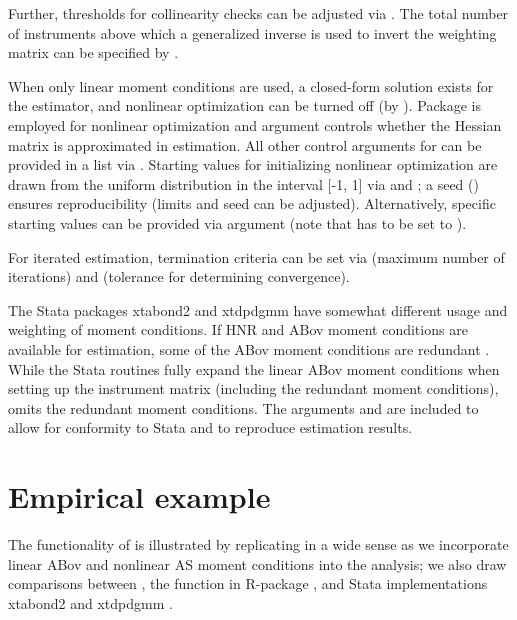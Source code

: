 Further, thresholds for collinearity checks can be adjusted via . The total number of instruments above which a generalized inverse is used to invert the weighting matrix can be specified by .

When only linear moment conditions are used, a closed-form solution exists for the estimator, and nonlinear optimization can be turned off (by ).
Package  is employed for nonlinear optimization and argument  controls whether the Hessian matrix is approximated in estimation. All other control arguments for  can be provided in a list via .
Starting values for initializing nonlinear optimization are drawn from the uniform distribution in the interval [-1, 1] via  and ; a seed () ensures reproducibility (limits and seed can be adjusted). Alternatively, specific starting values can be provided via argument  (note that  has to be set to ).

For iterated estimation, termination criteria can be set via  (maximum number of iterations) and  (tolerance for determining convergence).

The Stata packages xtabond2 \citep{Roo2018xtabond2} and xtdpdgmm have somewhat different usage and weighting of moment conditions.
If HNR and ABov moment conditions are available for estimation, some of the ABov moment conditions are redundant \citep[see][for a derivation]{Fri2019}. While the Stata routines fully expand the linear ABov moment conditions when setting up the instrument matrix (including the redundant moment conditions),  omits the redundant moment conditions.
The  arguments  and  are included to allow for conformity to Stata and to reproduce estimation results.















\section{Empirical example}\label{sec:example}
The functionality of  is illustrated by replicating \citet{AreBon1991} in a wide sense as we incorporate linear ABov and nonlinear AS moment conditions into the analysis; we also draw comparisons between , the  \citep{CroEtAl2020plm} function in R-package , and Stata implementations xtabond2 and xtdpdgmm \citep{Kri2019}.

